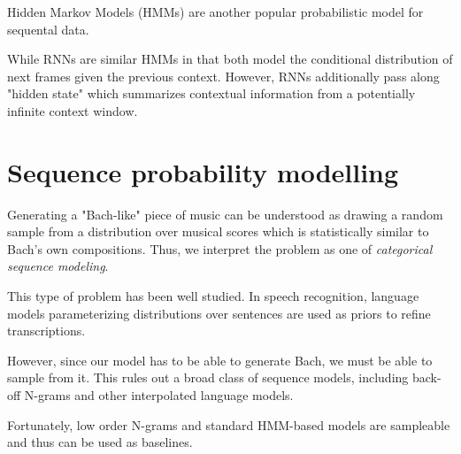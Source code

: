 Hidden Markov Models (HMMs) are another popular probabilistic model for
sequental data. 

While RNNs are similar HMMs in that both model the conditional distribution of
next frames given the previous context. However, RNNs additionally pass along
"hidden state" which summarizes contextual information from a potentially
infinite context window.


\section{Sequence probability modelling}

Generating a "Bach-like" piece of music can be understood as drawing a random
sample from a distribution over musical scores which is statistically similar
to Bach's own compositions. Thus, we interpret the problem as one of
\emph{categorical sequence modeling}.

This type of problem has been well studied. In speech recognition, language
models parameterizing distributions over sentences are used as priors to refine
transcriptions.

However, since our model has to be able to generate Bach, we must be able to
sample from it. This rules out a broad class of sequence models, including
back-off N-grams and other interpolated language models.

Fortunately, low order N-grams and standard HMM-based models are sampleable and
thus can be used as baselines.


